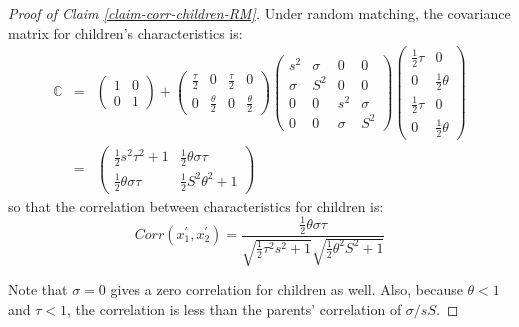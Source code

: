 \documentclass[
]{article}
\theoremstyle{definition}
\theoremstyle{definition}
\theoremstyle{definition}
\theoremstyle{definition}
\theoremstyle{remark}
\begin{document}
\begin{proof}[Proof of Claim \ref{claim-corr-children-RM}]

Under random matching, the covariance matrix for children's characteristics is:%
\begin{eqnarray*}
\mathbb{C} &=&\left( 
\begin{array}{cc}
1 & 0 \\ 
0 & 1%
\end{array}%
\right) +\left( 
\begin{array}{cccc}
\frac{\tau }{2} & 0 & \frac{\tau }{2} & 0 \\ 
0 & \frac{\theta }{2} & 0 & \frac{\theta }{2}%
\end{array}%
\right) \allowbreak \left( 
\begin{array}{cccc}
s^{2} & \sigma & 0 & 0 \\ 
\sigma & S^{2} & 0 & 0 \\ 
0 & 0 & s^{2} & \sigma \\ 
0 & 0 & \sigma & S^{2}%
\end{array}%
\right) \allowbreak \left( 
\begin{array}{cc}
\frac{1}{2}\tau & 0 \\ 
0 & \frac{1}{2}\theta \\ 
\frac{1}{2}\tau & 0 \\ 
0 & \frac{1}{2}\theta%
\end{array}%
\right) \\
&=&\left( 
\begin{array}{cc}
\frac{1}{2}s^{2}\tau ^{2}+1 & \frac{1}{2}\theta \sigma \tau \\ 
\frac{1}{2}\theta \sigma \tau & \frac{1}{2}S^{2}\theta ^{2}+1%
\end{array}%
\right)
\end{eqnarray*}%
so that the correlation between characteristics for children is: 
\[
Corr\left( x_{1}^{\prime },x_{2}^{\prime }\right) =\frac{\frac{1}{2}\theta
\sigma \tau }{\sqrt{\frac{1}{2}\tau ^{2}s^{2}+1}\sqrt{\frac{1}{2}\theta
^{2}S^{2}+1}} 
\]

Note that $\sigma =0$ gives a zero correlation for children as well. 
Also, because $\theta < 1$ and $\tau < 1$, the correlation is less than the 
parents' correlation of $\sigma/sS$.

\end{proof}
\end{document}

